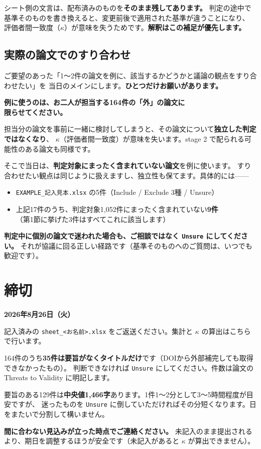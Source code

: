 \documentclass[a4paper]{ltjsarticle}
\newcommand{\keybox}[1]{%
  \par\medskip
  \noindent\colorbox{soft}{%
    \begin{minipage}{\dimexpr\linewidth-2\fboxsep\relax}
      \vspace{2pt}\centering\bfseries\large #1\vspace{4pt}
    \end{minipage}}%
  \par\medskip}
\newcommand{\notebox}[1]{%
  \par\medskip
  \noindent\colorbox{warn}{%
    \begin{minipage}{\dimexpr\linewidth-2\fboxsep\relax}
      \vspace{4pt}#1\vspace{4pt}
    \end{minipage}}%
  \par\medskip}
\begin{document}
\notebox{シート側の文言は、配布済みのものを\textbf{そのまま残してあります。}
判定の途中で基準そのものを書き換えると、変更前後で適用された基準が違うことになり、
評価者間一致度（$\kappa$）が意味を失うためです。\textbf{解釈はこの補足が優先します。}}

\subsection{実際の論文でのすり合わせ}

ご要望のあった「1〜2件の論文を例に、該当するかどうかと議論の観点をすり合わせたい」を
当日のメインにします。\textbf{ひとつだけお願いがあります。}

\keybox{例に使うのは、お二人が担当する164件の「外」の論文に\\ 限らせてください。}

\noindent
担当分の論文を事前に一緒に検討してしまうと、その論文について\textbf{独立した判定ではなくなり}、
$\kappa$（評価者間一致度）が意味を失います。stage 2 で配られる可能性のある論文も同様です。

\medskip
\noindent
そこで当日は、\textbf{判定対象にまったく含まれていない論文}を例に使います。
すり合わせたい観点は同じように扱えますし、独立性も保てます。具体的には——

\begin{itemize}
  \item \texttt{EXAMPLE\_記入見本.xlsx} の5件（Include / Exclude 3種 / Unsure）
  \item 上記17件のうち、判定対象1,052件にまったく含まれていない\textbf{9件}\\（第1節に挙げた3件はすべてこれに該当します）
\end{itemize}

\notebox{\textbf{判定中に個別の論文で迷われた場合も、ご相談ではなく \texttt{Unsure} にしてください。}
それが協議に回る正しい経路です（基準そのものへのご質問は、いつでも歓迎です）。}

\section{締切}

\keybox{2026年8月26日（火）}

\noindent
記入済みの \texttt{sheet\_<お名前>.xlsx} をご返送ください。集計と $\kappa$ の算出はこちらで行います。

\medskip
\noindent
164件のうち\textbf{35件は要旨がなくタイトルだけ}です（DOIから外部補完しても取得できなかったもの）。
判断できなければ \texttt{Unsure} にしてください。件数は論文の Threats to Validity に明記します。

\medskip
\noindent
要旨のある129件は\textbf{中央値1,466字}あります。1件1〜2分として3〜5時間程度が目安ですが、
迷ったものを \texttt{Unsure} に倒していただければその分短くなります。日をまたいで分割して構いません。

\notebox{\textbf{間に合わない見込みが立った時点でご連絡ください。}
未記入のまま提出されるより、期日を調整するほうが安全です（未記入があると $\kappa$ が算出できません）。}
\end{document}
